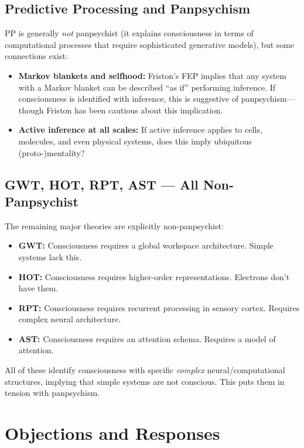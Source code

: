 \documentclass[11pt,a4paper]{report}
\begin{document}
\section{Predictive Processing and Panpsychism}

PP is generally \emph{not} panpsychist (it explains consciousness in terms of computational processes that require sophisticated generative models), but some connections exist:

\begin{itemize}[leftmargin=1.5em]
  \item \textbf{Markov blankets and selfhood:} Friston's FEP implies that any system with a Markov blanket can be described ``as if'' performing inference. If consciousness is identified with inference, this is suggestive of panpsychism---though Friston has been cautious about this implication.
  \item \textbf{Active inference at all scales:} If active inference applies to cells, molecules, and even physical systems, does this imply ubiquitous (proto-)mentality?
\end{itemize}

\section{GWT, HOT, RPT, AST --- All Non-Panpsychist}

The remaining major theories are explicitly non-panpsychist:
\begin{itemize}[leftmargin=1.5em]
  \item \textbf{GWT:} Consciousness requires a global workspace architecture. Simple systems lack this.
  \item \textbf{HOT:} Consciousness requires higher-order representations. Electrons don't have them.
  \item \textbf{RPT:} Consciousness requires recurrent processing in sensory cortex. Requires complex neural architecture.
  \item \textbf{AST:} Consciousness requires an attention schema. Requires a model of attention.
\end{itemize}

All of these identify consciousness with specific \emph{complex} neural/computational structures, implying that simple systems are not conscious. This puts them in tension with panpsychism.


\chapter{Objections and Responses}
\end{document}
